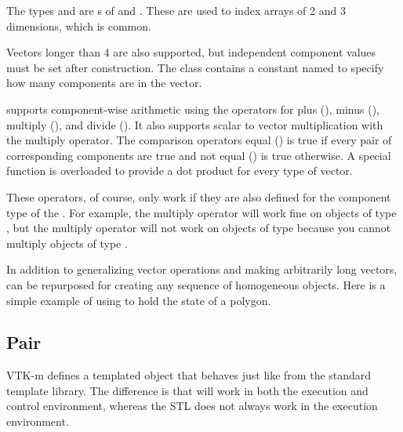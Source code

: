 The types  and  are s of
 and . These
are used to index arrays of 2 and 3 dimensions, which is common.

Vectors longer than 4 are also supported, but independent component values
must be set after construction. The  class contains a constant
named  to specify how many
components are in the vector.


 supports component-wise arithmetic using the operators
for plus (\textcode{+}), minus (\textcode{-}), multiply (\textcode{*}), and
divide (\textcode{/}). It also supports scalar to vector multiplication
with the multiply operator. The comparison operators equal (\textcode{==})
is true if every pair of corresponding components are true and not equal
(\textcode{!=}) is true otherwise. A special  function is
overloaded to provide a dot product for every type of vector.


These operators, of course, only work if they are also defined for the
component type of the . For example, the multiply operator will
work fine on objects of type , but the multiply
operator will not work on objects of type 
because you cannot multiply objects of type .

In addition to generalizing vector operations and making arbitrarily long
vectors,  can be repurposed for creating any sequence of
homogeneous objects. Here is a simple example of using  to hold
the state of a polygon.



\subsection{Pair}
\label{sec:Pair}

VTK-m defines a  templated object that
behaves just like  from the standard template
library. The difference is that  will work in both the execution
and control environment, whereas the STL  does not
always work in the execution environment.

